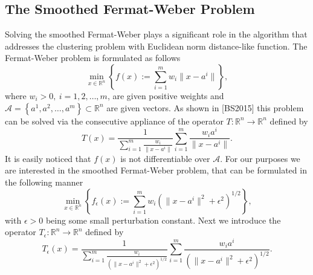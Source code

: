 \documentclass[11pt]{article}
\numberwithin{equation}{section}
\begin{document}
\subsection{The Smoothed Fermat-Weber Problem}
Solving the smoothed Fermat-Weber plays a significant role in the algorithm that addresses the clustering problem with Euclidean norm distance-like function.
The Fermat-Weber problem is formulated as follows
\begin{equation}
	\min_{x \in \mathbb{R}^n} \left\lbrace f(x) := \sum\limits_{i=1}^{m} w_i\|x - a^i\| \right\rbrace , \label{StateEq60}
\end{equation}
where $w_i>0, \: i=1,2, \ldots, m$, are given positive weights and $\mathcal{A} = \left\lbrace a^1, a^2, \ldots, a^m \right\rbrace \subset \mathbb{R}^n$ are given vectors. As shown in [BS2015] this problem can be solved via the consecutive appliance of the operator $T: \mathbb{R}^n \rightarrow \mathbb{R}^n$ defined by
\begin{equation*}
	T(x) = \frac{1}{\sum\limits_{i=1}^{m}\frac{w_i}{\|x - a^i\|}} \sum\limits_{i=1}^{m}\frac{w_i a^i}{\|x - a^i\|} .
\end{equation*}
It is easily noticed that $f(x)$ is not differentiable over $\mathcal{A}$.  For our purposes we are interested in the smoothed Fermat-Weber problem, that can be formulated in the following manner
\begin{equation}
	\min_{x \in \mathbb{R}^n} \left\lbrace f_{\epsilon}(x) := \sum\limits_{i=1}^{m} w_i \left( \|x - a^i\|^2 + {\epsilon}^2 \right)^{1/2} \right\rbrace , \label{StateEq61}
\end{equation}
with $\epsilon > 0$ being some small perturbation constant. Next we introduce the operator $T_{\epsilon}: \mathbb{R}^n \rightarrow \mathbb{R}^n$ defined by 
\begin{equation*}
	T_{\epsilon}(x) = \frac{1}{\sum\limits_{i=1}^{m}\frac{w_i}{\left( \|x - a^i\|^2 + {\epsilon}^2 \right)^{1/2}}} \sum\limits_{i=1}^{m}\frac{w_i a^i}{\left( \|x - a^i\|^2 + {\epsilon}^2 \right)^{1/2}} .
\end{equation*}
\end{document}
